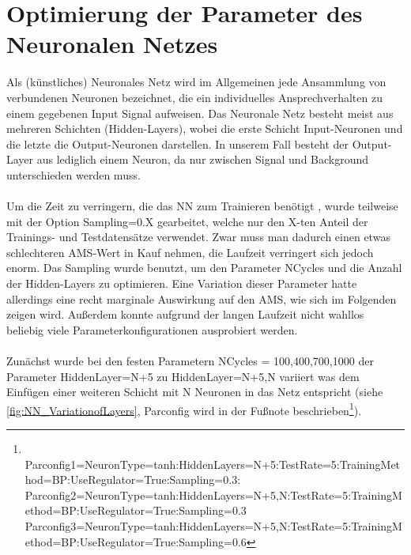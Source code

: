\section{Optimierung der Parameter des Neuronalen Netzes}
Als (künstliches) Neuronales Netz wird im Allgemeinen jede Ansammlung von verbundenen Neuronen bezeichnet, die ein individuelles Ansprechverhalten zu einem gegebenen Input Signal aufweisen. Das Neuronale Netz besteht meist aus mehreren Schichten (Hidden-Layers), wobei die erste Schicht Input-Neuronen und die letzte die Output-Neuronen darstellen. In unserem Fall besteht der Output-Layer aus lediglich einem Neuron, da nur zwischen Signal und Background unterschieden werden muss.\\ \\
Um die Zeit zu verringern, die das NN zum Trainieren benötigt , wurde teilweise mit der Option Sampling=0.X gearbeitet, welche nur den X-ten Anteil der Trainings- und Testdatensätze verwendet. Zwar muss man dadurch einen etwas schlechteren AMS-Wert in Kauf nehmen, die Laufzeit verringert sich jedoch enorm. Das Sampling wurde benutzt, um den Parameter NCycles und die Anzahl der Hidden-Layers zu optimieren. Eine Variation dieser Parameter hatte allerdings eine recht marginale Auswirkung auf den AMS, wie sich im Folgenden zeigen wird. Außerdem konnte aufgrund der langen Laufzeit nicht wahllos beliebig viele Parameterkonfigurationen ausprobiert werden.\\ \\
Zunächst wurde bei den festen Parametern NCycles = 100,400,700,1000 der Parameter HiddenLayer=N+5 zu HiddenLayer=N+5,N variiert was dem Einfügen einer weiteren Schicht mit N Neuronen in das Netz entspricht (siehe \ref{fig:NN_VariationofLayers}, Parconfig wird in der Fußnote beschrieben\footnote{\\ Parconfig1=NeuronType=tanh:HiddenLayers=N+5:TestRate=5:TrainingMethod=BP:UseRegulator=True:Sampling=0.3:\\
Parconfig2=NeuronType=tanh:HiddenLayers=N+5,N:TestRate=5:TrainingMethod=BP:UseRegulator=True:Sampling=0.3\\
Parconfig3=NeuronType=tanh:HiddenLayers=N+5,N:TestRate=5:TrainingMethod=BP:UseRegulator=True:Sampling=0.6}). 

